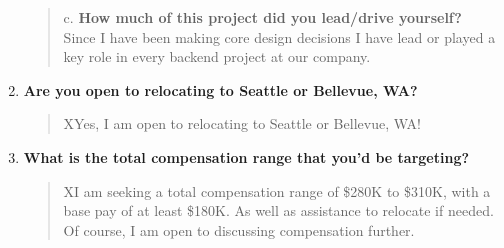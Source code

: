 \begin{cvparagraph}
\begin{enumerate}
\begin{quote}
          c. \textbf{How much of this project did you lead/drive yourself?} \\
          Since I have been making core design decisions I have lead or played a key role in every backend project at our company.

      \end{quote}
      \item \textbf{Are you open to relocating to Seattle or Bellevue, WA?} \\
      \begin{quote}
          XYes, I am open to relocating to Seattle or Bellevue, WA!
      \end{quote}
      \item \textbf{What is the total compensation range that you'd be targeting?} \\
      \begin{quote}
          XI am seeking a total compensation range of \$280K to \$310K, with a base pay of at least \$180K.
          As well as assistance to relocate if needed.
          Of course, I am open to discussing compensation further.

      \end{quote}
    \end{enumerate}
\end{cvparagraph}
